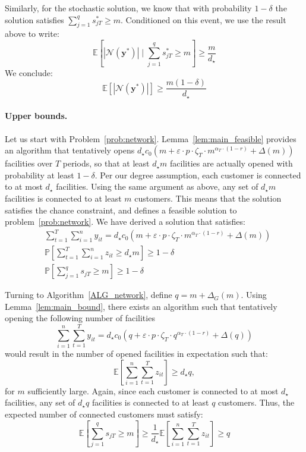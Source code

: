 \documentclass[nonblindrev]{informs3noheader}
\def\E{\mathbb{E}}
\def\P{\mathbb{P}}
\def\calN{\mathcal{N}}
\def\by{\boldsymbol{y}}
\begin{document}
Similarly, for the stochastic solution, we know that with probability $1-\delta$ the solution satisfies $\sum_{j=1}^q s^*_{jT} \geq m$. Conditioned on this event, we use the result above to write:
\[\E\left[|\calN(\by^*)| \mid \sum_{j=1}^q s^*_{jT} \geq m\right] \geq \frac{m}{d_\star}\]
We conclude:
\[\E[|\calN(\by^*)|] \geq \frac{m(1-\delta)}{d_\star}\]

\paragraph{Upper bounds.}

Let us start with Problem~\eqref{prob:network}. Lemma~\ref{lem:main_feasible} provides an algorithm that tentatively opens $d_\star c_0\left(m + \varepsilon\cdot p \cdot\zeta_T\cdot m^{\alpha_T\cdot(1-r)} + \Delta(m)\right)$ facilities over $T$ periods, so that at least $d_\star m$ facilities are actually opened with probability at least $1-\delta$. Per our degree assumption, each customer is connected to at most $d_\star$ facilities. Using the same argument as above, any set of $d_\star m$ facilities is connected to at least $m$ customers. This means that the solution satisfies the chance constraint, and defines a feasible solution to problem~\eqref{prob:network}. We have derived a solution that satisfies:
\begin{align*}
    &\sum_{t=1}^T \sum_{i=1}^n y_{it} =d_\star c_0 \left(m + \varepsilon\cdot p \cdot\zeta_T\cdot m^{\alpha_T\cdot(1-r)}+ \Delta(m)\right) \\
    & \P\left[\sum_{t=1}^T \sum_{i=1}^n z_{it} \geq d_\star m\right] \geq 1-\delta\\
    & \P\left[\sum_{j=1}^q s_{jT} \geq m\right] \geq 1-\delta
\end{align*}

Turning to Algorithm~\ref{ALG_network}, define $q=m+\Delta_G(m)$. Using Lemma~\ref{lem:main_bound}, there exists an algorithm such that tentatively opening the following number of facilities
$$\sum_{i=1}^n \sum_{t=1}^T y_{it}=d_\star c_0 \left(q + \varepsilon\cdot p \cdot\zeta_T\cdot q^{\alpha_T\cdot(1-r)} + \Delta(q)\right)$$
would result in the number of opened facilities in expectation such that:
\[\E\left[\sum_{i=1}^n \sum_{t=1}^T z_{it}\right]  \geq d_\star q,\]
for $m$ sufficiently large. Again, since each customer is connected to at most $d_\star$ facilities, any set of $d_\star q$ facilities is connected to at least $q$ customers. Thus, the expected number of connected customers must satisfy:
\[\E\left[\sum_{j=1}^q s_{jT} \geq m\right]\geq\frac{1}{d_\star}\E\left[\sum_{i=1}^n \sum_{t=1}^T z_{it}\right]\geq q\]\
\end{document}
